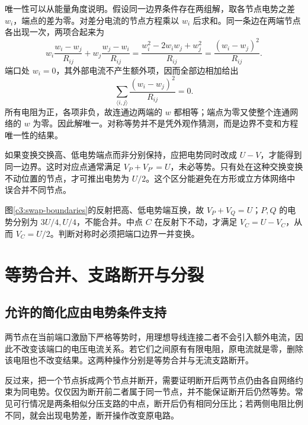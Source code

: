 唯一性可以从能量角度说明。假设同一边界条件存在两组解，取各节点电势之差 $w_i$，端点的差为零。对差分电流的节点方程乘以 $w_i$ 后求和。同一条边在两端节点各出现一次，两项合起来为
\[
 w_i\frac{w_i-w_j}{R_{ij}}+w_j\frac{w_j-w_i}{R_{ij}}
 =\frac{w_i^2-2w_iw_j+w_j^2}{R_{ij}}
 =\frac{(w_i-w_j)^2}{R_{ij}}.
\]
端口处 $w_i=0$，其外部电流不产生额外项，因而全部边相加给出
\[
 \sum_{\langle i,j\rangle}\frac{(w_i-w_j)^2}{R_{ij}}=0.
\]
所有电阻为正，各项非负，故连通边两端的 $w$ 都相等；端点为零又使整个连通网络的 $w$ 为零。因此解唯一。对称等势并不是凭外观作猜测，而是边界不变和方程唯一性的结果。

如果变换交换高、低电势端点而非分别保持，应把电势同时改成 $U-V$，才能得到同一边界。这时对应点通常满足 $V_P+V_{P'}=U$，未必等势。只有处在这种交换变换不动位置的节点，才可推出电势为 $U/2$。这个区分能避免在方形或立方体网络中误合并不同节点。


图\ref{c3:swap-boundaries}的反射把高、低电势端互换，故 $V_P+V_Q=U$；$P,Q$ 的电势分别为 $3U/4,U/4$，不能合并。中点 $C$ 在反射下不动，才满足 $V_C=U-V_C$，从而 $V_C=U/2$。判断对称时必须把端口边界一并变换。

\section{等势合并、支路断开与分裂}
\subsection{允许的简化应由电势条件支持}

两节点在当前端口激励下严格等势时，用理想导线连接二者不会引入额外电流，因此不改变该端口的电压电流关系。若它们之间原有有限电阻，原电流就是零，删除该电阻也不改变结果。这两种操作分别是等势合并与无流支路断开。

反过来，把一个节点拆成两个节点并断开，需要证明断开后两节点仍由各自网络约束为同电势。仅仅因为断开前二者属于同一节点，并不能保证断开后仍然等势。常见可行情况是两条相似分压支路的中点，断开后仍有相同分压比；若两侧电阻比例不同，就会出现电势差，断开操作改变原电路。

